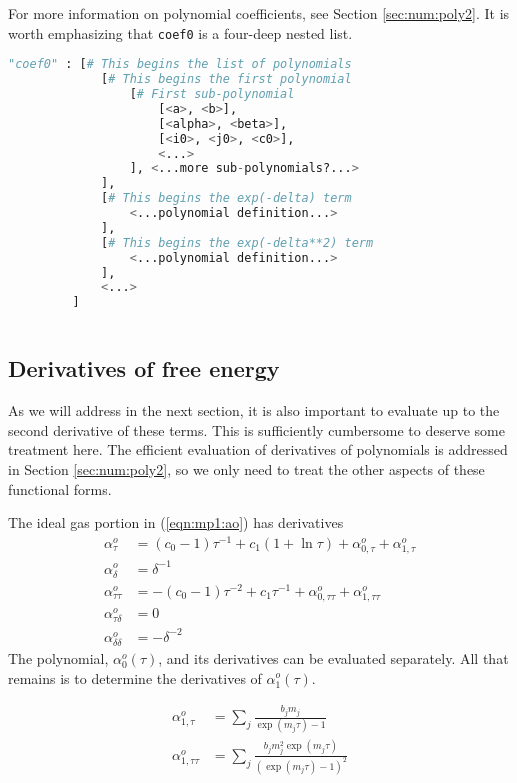 For more information on polynomial coefficients, see Section \ref{sec:num:poly2}.  It is worth emphasizing that \texttt{coef0} is a four-deep nested list.
\begin{lstlisting}[language=Python]
"coef0" : [# This begins the list of polynomials
             [# This begins the first polynomial
                 [# First sub-polynomial
                     [<a>, <b>],
                     [<alpha>, <beta>],
                     [<i0>, <j0>, <c0>],
                     <...>
                 ], <...more sub-polynomials?...>
             ],
             [# This begins the exp(-delta) term
                 <...polynomial definition...>
             ],
             [# This begins the exp(-delta**2) term
                 <...polynomial definition...>
             ],
             <...>
         ]
             
\end{lstlisting}

\subsection{Derivatives of free energy}

As we will address in the next section, it is also important to evaluate up to the second derivative of these terms.  This is sufficiently cumbersome to deserve some treatment here.  The efficient evaluation of derivatives of polynomials is addressed in Section \ref{sec:num:poly2}, so we only need to treat the other aspects of these functional forms.

The ideal gas portion in (\ref{eqn:mp1:ao}) has derivatives
\begin{subequations}
\begin{align}
\alpha^o_\tau &= (c_0-1)\tau^{-1} + c_1 (1 + \ln \tau) + \alpha^o_{0,\tau} + \alpha^o_{1,\tau}\\
\alpha^o_\delta &= \delta^{-1}\\
\alpha^o_{\tau\tau} &= -(c_0-1)\tau^{-2} + c_1 \tau^{-1} + \alpha^o_{0,\tau\tau} + \alpha^o_{1,\tau\tau}\\
\alpha^o_{\tau\delta} &= 0\\
\alpha^o_{\delta\delta} &= -\delta^{-2}
\end{align}
\end{subequations}
The polynomial, $\alpha^o_0(\tau)$, and its derivatives can be evaluated separately.  All that remains is to determine the derivatives of $\alpha^o_1(\tau)$.

\begin{subequations}
\begin{align}
\alpha^o_{1,\tau} &= \sum_j \frac{b_j m_j}{\exp(m_j \tau) - 1}\\
\alpha^o_{1,\tau\tau} &= \sum_j \frac{b_j m_j^2 \exp(m_j \tau)}{(\exp(m_j \tau) - 1)^{2}}
\end{align}
\end{subequations}

